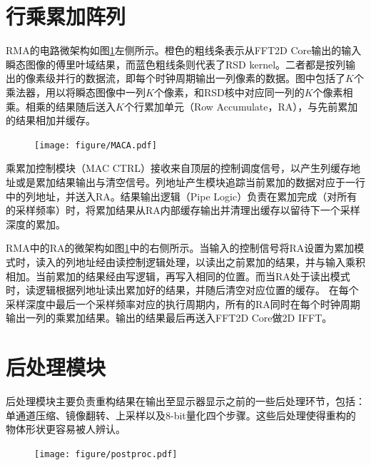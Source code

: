 \documentclass[master]{shtthesis}             %
\begin{document}
\section{行乘累加阵列}\label{sec:rowmacarray}

RMA的电路微架构如图\ref{fig:macarr}左侧所示。橙色的粗线条表示从FFT2D Core输出的输入瞬态图像的傅里叶域结果，而蓝色粗线条则代表了RSD kernel。二者都是按列输出的像素级并行的数据流，即每个时钟周期输出一列像素的数据。图中包括了$K$个乘法器，用以将瞬态图像中一列$K$个像素，和RSD核中对应同一列的$K$个像素相乘。相乘的结果随后送入$K$个行累加单元（Row Accumulate，RA），与先前累加的结果相加并缓存。
\begin{figure}[!tb]
    \centering
    \texttt{[image: figure/MACA.pdf]}
    \label{fig:macarr}
\end{figure}
乘累加控制模块（MAC CTRL）接收来自顶层的控制调度信号，以产生列缓存地址或是累加结果输出与清空信号。列地址产生模块追踪当前累加的数据对应于一行中的列地址，并送入RA。结果输出逻辑（Pipe Logic）负责在累加完成（对所有的采样频率）时，将累加结果从RA内部缓存输出并清理出缓存以留待下一个采样深度的累加。

RMA中的RA的微架构如图\ref{fig:macarr}中的右侧所示。当输入的控制信号将RA设置为累加模式时，读入的列地址经由读控制逻辑处理，以读出之前累加的结果，并与输入乘积相加。当前累加的结果经由写逻辑，再写入相同的位置。而当RA处于读出模式时，读逻辑根据列地址读出累加好的结果，并随后清空对应位置的缓存。
在每个采样深度中最后一个采样频率对应的执行周期内，所有的RA同时在每个时钟周期输出一列的乘累加结果。输出的结果最后再送入FFT2D Core做2D IFFT。

\section{后处理模块}\label{sec:postproc}

后处理模块主要负责重构结果在输出至显示器显示之前的一些后处理环节，包括：单通道压缩、镜像翻转、上采样以及8-bit量化四个步骤。这些后处理使得重构的物体形状更容易被人辨认。

\begin{figure}[!tb]
    \centering
    \texttt{[image: figure/postproc.pdf]}
    \label{fig:pp}
\end{figure}
\end{document}
